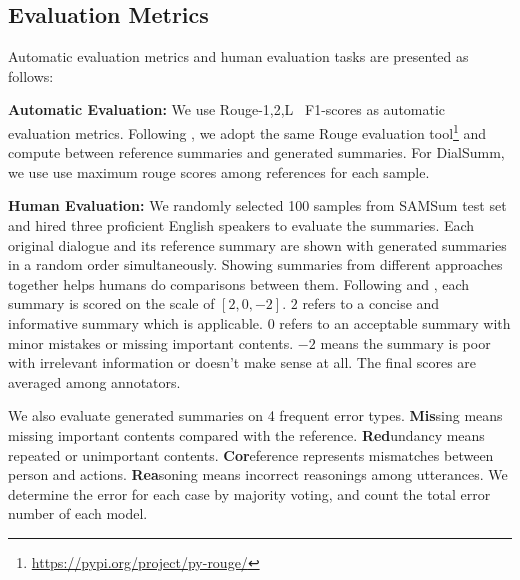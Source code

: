 \subsection{Evaluation Metrics}
Automatic evaluation metrics and human evaluation tasks are presented
as follows:

\textbf{Automatic Evaluation:} We use Rouge-1,2,L~\cite{lin2004rouge} F1-scores as automatic evaluation metrics. Following \citet{feng-etal-2021-language}, we adopt the same Rouge evaluation tool\footnote{\url{https://pypi.org/project/py-rouge/}} and compute between reference summaries and generated summaries. For DialSumm, we use use maximum rouge scores among references for each sample.

\textbf{Human Evaluation:} 
We randomly selected 100 samples from SAMSum test set and hired three proficient English speakers to evaluate the summaries. 
Each original dialogue and its reference summary are shown with generated summaries in a random order simultaneously. Showing summaries from different approaches together helps humans do comparisons between them.
Following \citet{chen2020multi} and \citet{liu2021coreference}, each summary is scored on the scale of $[2, 0, -2]$. $2$ refers to a concise and informative summary which is applicable. $0$ refers to an acceptable summary with minor mistakes or missing important contents. $-2$ means the summary is poor with irrelevant information or doesn't make sense at all. The final scores are averaged among annotators.

We also evaluate generated summaries on 4 frequent error types. 
\textbf{Mis}sing means missing important contents compared with the reference.
\textbf{Red}undancy means repeated or unimportant contents. %
\textbf{Cor}eference represents mismatches between person and actions. %
\textbf{Rea}soning means incorrect reasonings among utterances.
We determine the error for each case by majority voting, and count the total error number of each model.


